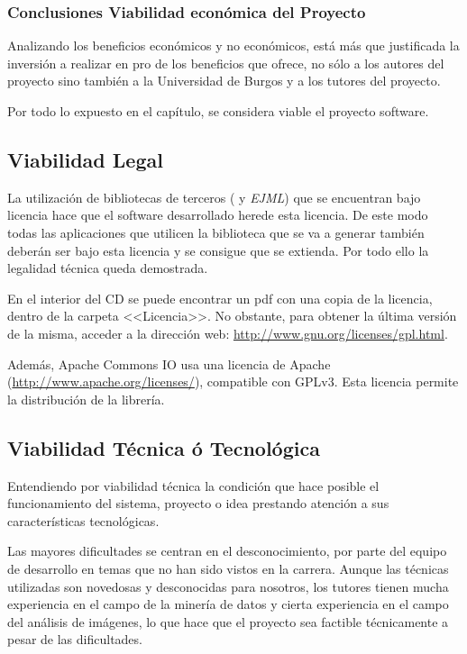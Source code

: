 \subsubsection{Conclusiones Viabilidad económica del Proyecto}
Analizando los beneficios económicos y no económicos, está más que justificada la inversión a realizar en pro de los beneficios que ofrece, no sólo a los autores del proyecto sino también a la Universidad de Burgos y a los tutores del proyecto.

Por todo lo expuesto en el capítulo, se considera viable el proyecto software.


\subsection{Viabilidad Legal}
La utilización de bibliotecas de terceros (\weka{} y \textit{EJML}) que se encuentran bajo licencia \gnu{} hace que el software desarrollado herede esta licencia. De este modo todas las aplicaciones que utilicen la biblioteca que se va a generar también deberán ser bajo esta licencia y se consigue que se extienda. Por todo ello la legalidad técnica queda demostrada.

En el interior del CD se puede encontrar un pdf con una copia de la licencia, dentro de la carpeta <<Licencia>>. No obstante, para obtener la última versión de la misma, acceder a la dirección web: \url{http://www.gnu.org/licenses/gpl.html}.

Además, Apache Commons IO usa una licencia de Apache (\url{http://www.apache.org/licenses/}), compatible con GPLv3. Esta licencia permite la distribución de la librería.

\subsection{Viabilidad Técnica ó Tecnológica}
Entendiendo por viabilidad técnica la condición que hace posible el funcionamiento del sistema, proyecto o idea prestando atención a sus características tecnológicas.

Las mayores dificultades se centran en el desconocimiento, por parte del equipo de desarrollo en temas que no han sido vistos en la carrera. Aunque las técnicas utilizadas son novedosas y desconocidas para nosotros, los tutores tienen mucha experiencia en el campo de la minería de datos y cierta experiencia en el campo del análisis de imágenes, lo que hace que el proyecto sea factible técnicamente a pesar de las dificultades.

